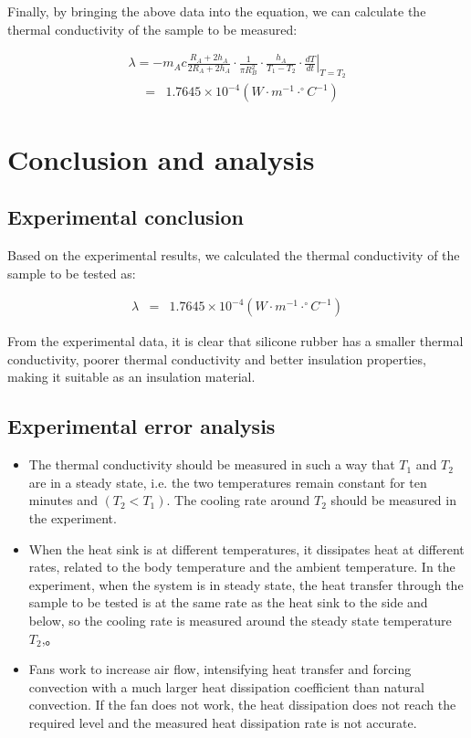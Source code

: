 \documentclass[UTF8]{article}
\begin{document}
     Finally, by bringing the above data into the equation, we can calculate the thermal conductivity of the sample to be measured:
     
     \begin{eqnarray}\lambda  =  -m_{A}c\frac{R_{A}+2h_{A}  }{2R_{A}+2h_{A}}  \cdot \frac{1}{\pi R_{B}^2 }\cdot \frac{h_{A} }{T_{1}-T_{2}  }\cdot\left. \frac{dT}{dt} \right| _{T  =  T_{2} }    \end{eqnarray}
     \begin{eqnarray} & = & 1.7645\times 10^{-4} \left ( W\cdot m^{-1}\cdot ^{\circ}C^{-1}    \right ) \end{eqnarray}
    
\section{Conclusion and analysis}
\subsection{Experimental conclusion}

Based on the experimental results, we calculated the thermal conductivity of the sample to be tested as:

\begin{eqnarray}\lambda & = & 1.7645\times 10^{-4} \left ( W\cdot m^{-1}\cdot ^{\circ}C^{-1}    \right ) \end{eqnarray}

From the experimental data, it is clear that silicone rubber has a smaller thermal conductivity, poorer thermal conductivity and better insulation properties, making it suitable as an insulation material.

\subsection{Experimental error analysis}
	\begin{itemize}
	\item The thermal conductivity should be measured in such a way that $T_{1}$ and $T_{2}$ are in a steady state, i.e. the two temperatures remain constant for ten minutes and $\left ( T_{2}< T_{1}   \right ) $. The cooling rate around $T_{2}$ should be measured in the experiment.
	\item When the heat sink is at different temperatures, it dissipates heat at different rates, related to the body temperature and the ambient temperature. In the experiment, when the system is in steady state, the heat transfer through the sample to be tested is at the same rate as the heat sink to the side and below, so the cooling rate is measured around the steady state temperature $T_{2}$,。
	\item Fans work to increase air flow, intensifying heat transfer and forcing convection with a much larger heat dissipation coefficient than natural convection. If the fan does not work, the heat dissipation does not reach the required level and the measured heat dissipation rate is not accurate.
\end{itemize}
\end{document}

